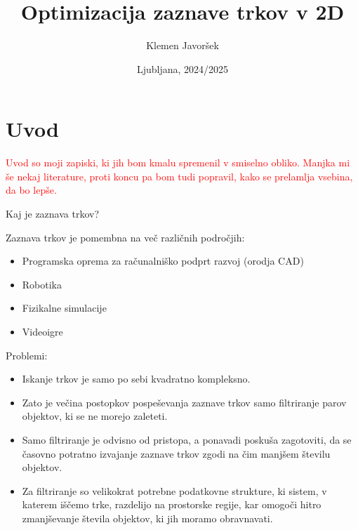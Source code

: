 \documentclass[a4paper,12pt]{article}
\begin{document}
\begin{titlepage}
    \title{\Huge Optimizacija zaznave trkov v 2D}
    \author{Klemen Javoršek}
    \date{Ljubljana, 2024/2025}
    \maketitle
    \renewcommand{\headrulewidth}{0cm}
    \fancyhf{}
    \thispagestyle{fancy}
\end{titlepage}

\newpage
\quad
\thispagestyle{empty}
\newpage
\tableofcontents
\newpage
\section{Uvod}

\textcolor{red}{Uvod so moji zapiski, ki jih bom kmalu spremenil v smiselno obliko.
Manjka mi še nekaj literature, proti koncu pa bom tudi popravil, kako se prelamlja
vsebina, da bo lepše.}

Kaj je zaznava trkov?

Zaznava trkov je pomembna na več različnih področjih:
\begin{itemize}
    \item Programska oprema za računalniško podprt razvoj (orodja CAD)
    \item Robotika
    \item Fizikalne simulacije
    \item Videoigre
\end{itemize}
Problemi:
\begin{itemize}
    \item Iskanje trkov je samo po sebi kvadratno kompleksno.
    \item Zato je večina postopkov pospeševanja zaznave trkov samo filtriranje parov objektov, ki se ne morejo zaleteti.
    \item Samo filtriranje je odvisno od pristopa, a ponavadi poskuša zagotoviti, da se časovno potratno izvajanje zaznave trkov zgodi na čim manjšem številu objektov.
    \item Za filtriranje so velikokrat potrebne podatkovne strukture, ki sistem, v katerem iščemo trke, razdelijo na prostorske regije, kar omogoči hitro zmanjševanje števila objektov, ki jih moramo obravnavati.
\end{itemize}
\end{document}

